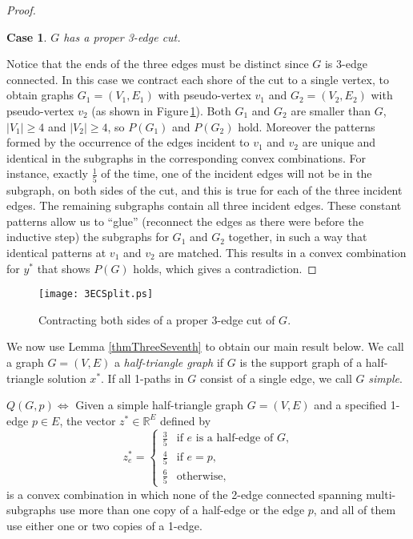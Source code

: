 \documentclass[oneeqnum,final]{siamltex1213}
\newcommand{\Real}{{\mathbb R}}
\newtheorem{case}{Case}
\begin{document}
\begin{proof}
\begin{case} \label{caseTwo}
$G$ has a proper 3-edge cut.
\end{case}
Notice that the ends of the three edges must be distinct since $G$ is 3-edge connected. In this case we contract each shore of the cut to a single vertex, to obtain graphs $G_{1}=(V_{1}, E_{1})$ with pseudo-vertex $v_{1}$ and $G_{2}=(V_{2}, E_{2})$ with pseudo-vertex $v_{2}$ (as shown in Figure\,\ref{3ECSplitting}). Both $G_{1}$ and $G_{2}$ are smaller than $G$, $|V_{1}|\ge 4$ and $|V_{2}|\ge 4$, so $P(G_{1})$ and $P(G_{2})$ hold. Moreover the patterns formed by the occurrence of the edges incident to $v_{1}$ and $v_{2}$ are unique and identical in the subgraphs in the corresponding convex combinations. For instance, exactly $\frac{1}{5}$ of the time, one of the incident edges will not be in the subgraph, on both sides of the cut, and this is true for each of the three incident edges. The remaining subgraphs contain all three incident edges. These constant patterns allow us to ``glue'' (reconnect the edges as there were before the inductive step) the subgraphs for $G_{1}$ and $G_{2}$ together, in such a way that identical patterns at $v_{1}$ and $v_{2}$ are matched. This results in a convex combination for $y^{*}$ that shows $P(G)$ holds, which gives a contradiction.
\end{proof}

\begin{figure}
\begin{center}
\texttt{[image: 3ECSplit.ps]}
\end{center}
\caption{Contracting both sides of a proper 3-edge cut of $G$.}
\label{3ECSplitting}
\end{figure}

We now use Lemma \ref{thmThreeSeventh} to obtain our main result below. We call a graph \mbox{$G=(V, E)$} a \emph{half-triangle graph} if $G$ is the support graph of a half-triangle solution $x^{*}$. If all 1-paths in $G$ consist of a single edge, we call $G$ \emph{simple}.

\begin{definition}\label{defThm}
$Q(G, p) \Leftrightarrow $ Given a simple half-triangle graph $G=(V, E)$ and a specified 1-edge $p\in E$, the vector $z^{*}\in \Real^{E}$ defined by
\[
 z^{*}_{e} =
  \begin{cases}
   \frac{3}{5} & \text{if } e \text{ is a half-edge of } G \text{,} \\
   \frac{4}{5} & \text{if } e = p \text{,} \\
   \frac{6}{5} & \text{otherwise,}
  \end{cases}
\]is a convex combination in which none of the 2-edge connected spanning multi-subgraphs use more than one copy of a half-edge or the edge $p$, and all of them use either one or two copies of a 1-edge.
\end{definition}
\end{document}
